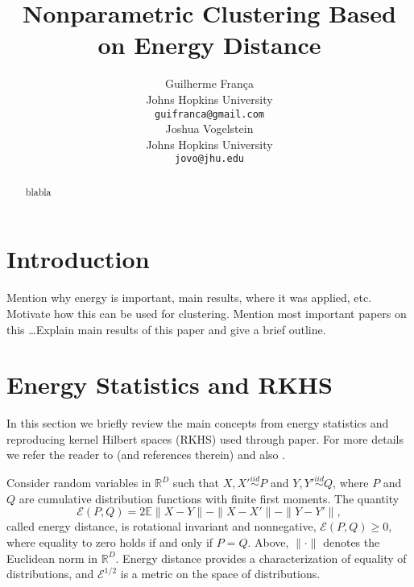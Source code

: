 \documentclass{article}
\title{Nonparametric Clustering Based on Energy Distance}
\author{
Guilherme Fran\c ca \\
Johns Hopkins University\\
\texttt{guifranca@gmail.com} \\
\And
Joshua Vogelstein \\
Johns Hopkins University\\
\texttt{jovo@jhu.edu}
}
\def\Energy{\mathcal{E}}
\def\E{\mathbb{E}}
\begin{document}
\maketitle

\begin{abstract}
blabla
\end{abstract}



\section{Introduction}

Mention why energy is important, main results, where it was applied, etc.
Motivate how this can be used for clustering. Mention most important
papers on this \ldots Explain main results of this paper and give a brief
outline.

\section{Energy Statistics and RKHS}

In this section we briefly review the main concepts from energy
statistics and reproducing kernel Hilbert spaces (RKHS) used through paper. 
For more details we refer the reader
to \cite{Szkely2013} 
(and references therein) and also \cite{Sejdinovic2013}.

Consider random variables in $\mathbb{R}^D$ 
such that $X,X' \stackrel{iid}{\sim} P$ and 
$Y,Y' \stackrel{iid}{\sim} Q$, where $P$ and $Q$ are cumulative
distribution functions with finite first moments. 
The quantity \cite{Szkely2013}
\begin{equation}\label{eq:energy}
\Energy(P, Q) = 2 \E \| X - Y\| - \| X - X' \| - \| Y - Y' \|,
\end{equation}
called energy distance, 
is rotational invariant and nonnegative, $\Energy(P,Q) \ge 0$, where
equality
to zero holds if and only if $P = Q$.
Above, $\| \cdot \|$ denotes the
Euclidean norm in $\mathbb{R}^D$. 
Energy distance
provides a characterization of equality of distributions, and
$\Energy^{1/2}$ is
a metric on the space of distributions.
\end{document}
